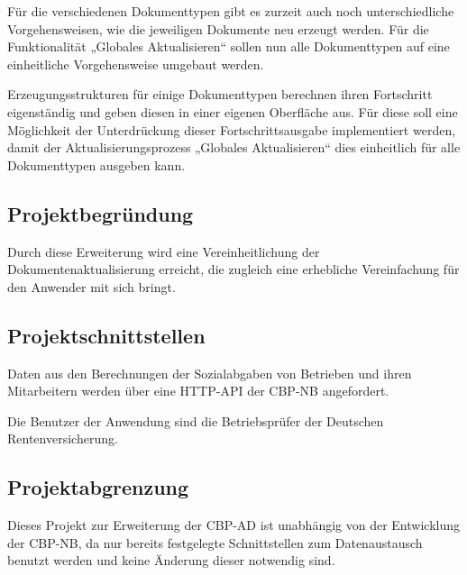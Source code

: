 Für die verschiedenen Dokumenttypen gibt es zurzeit auch noch unterschiedliche Vorgehensweisen, wie die jeweiligen Dokumente neu erzeugt werden. Für die Funktionalität „Globales Aktualisieren“ sollen nun alle Dokumenttypen auf eine einheitliche Vorgehensweise umgebaut werden.

Erzeugungsstrukturen für einige Dokumenttypen berechnen ihren Fortschritt eigenständig und geben diesen in einer eigenen Oberfläche aus. Für diese soll eine Möglichkeit der Unterdrückung dieser Fortschrittsausgabe implementiert werden, damit der Aktualisierungsprozess „Globales Aktualisieren“ dies einheitlich für alle Dokumenttypen ausgeben kann.


\subsection{Projektbegründung} 
\label{sec:Projektbegruendung}

Durch diese Erweiterung wird eine Vereinheitlichung der Dokumentenaktualisierung erreicht, die zugleich eine erhebliche Vereinfachung für den Anwender mit sich bringt.


\subsection{Projektschnittstellen} 
\label{sec:Projektschnittstellen}

Daten aus den Berechnungen der Sozialabgaben von Betrieben und ihren Mitarbeitern werden über eine \acs{HTTP}-\acs{API} der \acs{CBP-NB} angefordert.

Die Benutzer der Anwendung sind die Betriebsprüfer der Deutschen Rentenversicherung.


\subsection{Projektabgrenzung} 
\label{sec:Projektabgrenzung}

Dieses Projekt zur Erweiterung der \acs{CBP-AD} ist unabhängig von der Entwicklung der \ac{CBP-NB}, da nur bereits festgelegte Schnittstellen zum Datenaustausch benutzt werden und keine Änderung dieser notwendig sind.